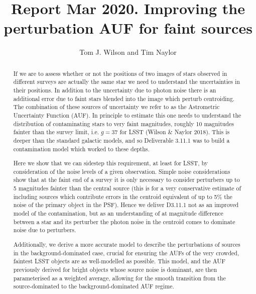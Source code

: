 \documentclass[fleqn,usenatbib]{mnras}
\title[]{Report Mar 2020.  Improving the perturbation AUF for faint sources}
\author[Tom J. Wilson and Tim Naylor]{
Tom J. Wilson
and Tim Naylor
\\
}
\date{}
\begin{document}
\label{firstpage}
\pagerange{\pageref{firstpage}--\pageref{lastpage}}
\maketitle
\begin{abstract}

If we are to assess whether or not the positions of two images of stars observed in different surveys are actually the same star we need to understand the uncertainties in their positions.  In addition to the uncertainty due to photon noise there is an additional error due to faint stars blended into the image which perturb centroiding.  The combination of these sources of uncertainty we refer to as the Astrometric Uncertainty Function (AUF).  In principle to estimate this one needs to understand the distribution of contaminating stars to very faint magnitudes, roughly 10 magnitudes fainter than the survey limit, i.e. $g=37$ for LSST (Wilson \& Naylor 2018).  This is deeper than the standard galactic models, and so Deliverable 3.11.1 was to build a contamination model which worked to these depths.

Here we show that we can sidestep this requirement, at least for LSST, by consideration of the noise levels of a given observation.  Simple noise considerations show that at the faint end of a survey it is only necessary to consider perturbers up to 5 magnitudes fainter than the central source (this is for a very conservative estimate of including sources which contribute errors in the centroid equivalent of up to 5\% the noise of the primary object in the PSF).  
Hence we deliver D3.11.1 not as an improved model of the contamination, but as an understanding of at magnitude difference between a star and its perturber the photon noise in the centroid comes to dominate noise due to perturbers.

Additionally, we derive a more accurate model to describe the perturbations of sources in the background-dominated case, crucial for ensuring the AUFs of the very crowded, faintest LSST objects are as well-modelled as possible. This model, and the AUF previously derived for bright objects whose source noise is dominant, are then parameterised as a weighted average, allowing for the smooth transition from the source-dominated to the background-dominated AUF regime.  

\end{abstract}
\end{document}
